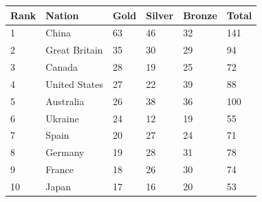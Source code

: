 \documentclass{article}
\begin{document}
\begin{tabular}{llllll}
\toprule
Rank & Nation & Gold & Silver & Bronze & Total \\
\midrule
1 & China & 63 & 46 & 32 & 141 \\
2 & Great Britain & 35 & 30 & 29 & 94 \\
3 & Canada & 28 & 19 & 25 & 72 \\
4 & United States & 27 & 22 & 39 & 88 \\
5 & Australia & 26 & 38 & 36 & 100 \\
6 & Ukraine & 24 & 12 & 19 & 55 \\
7 & Spain & 20 & 27 & 24 & 71 \\
8 & Germany & 19 & 28 & 31 & 78 \\
9 & France & 18 & 26 & 30 & 74 \\
10 & Japan & 17 & 16 & 20 & 53 \\
\bottomrule
\end{tabular}
\end{document}
